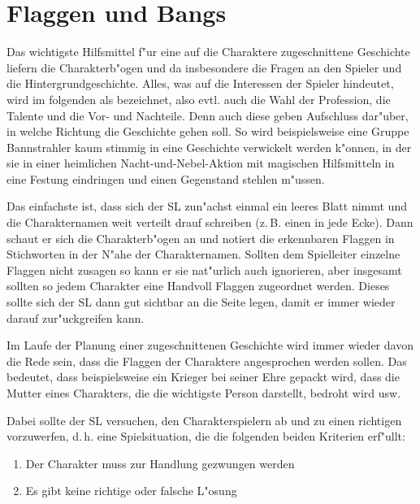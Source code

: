 \section{Flaggen und Bangs}
Das wichtigste Hilfsmittel f"ur eine auf die Charaktere zugeschnittene Geschichte liefern die Charakterb"ogen und da insbesondere die Fragen an den Spieler und die Hintergrundgeschichte. Alles, was auf die Interessen der Spieler hindeutet, wird im folgenden als  bezeichnet, also evtl. auch die Wahl der Profession, die Talente und die Vor- und Nachteile. Denn auch diese geben Aufschluss dar"uber, in welche Richtung die Geschichte gehen soll. So wird beispielsweise eine Gruppe Bannstrahler kaum stimmig in eine Geschichte verwickelt werden k"onnen, in der sie in einer heimlichen Nacht-und-Nebel-Aktion mit magischen Hilfsmitteln in eine Festung eindringen und einen Gegenstand stehlen m"ussen.

Das einfachste ist, dass sich der SL zun"achst einmal ein leeres Blatt nimmt und die Charakternamen weit verteilt drauf schreiben (z.\,B. einen in jede Ecke). Dann schaut er sich die Charakterb"ogen an und notiert die erkennbaren Flaggen in Stichworten in der N"ahe der Charakternamen. Sollten dem Spielleiter einzelne Flaggen nicht zusagen so kann er sie nat"urlich auch ignorieren, aber insgesamt sollten so jedem Charakter eine Handvoll Flaggen zugeordnet werden. Dieses  sollte sich der SL dann gut sichtbar an die Seite legen, damit er immer wieder darauf zur"uckgreifen kann.

Im Laufe der Planung einer zugeschnittenen Geschichte wird immer wieder davon die Rede sein, dass die Flaggen der Charaktere angesprochen werden sollen. Das bedeutet, dass beispielsweise ein Krieger bei seiner Ehre gepackt wird, dass die Mutter eines Charakters, die die wichtigste Person darstellt, bedroht wird usw.

Dabei sollte der SL versuchen, den Charakterspielern ab und zu einen richtigen  vorzuwerfen, d.\,h. eine Spielsituation, die die folgenden beiden Kriterien erf"ullt:
\begin{enumerate}
  \item Der Charakter muss zur Handlung gezwungen werden
  \item Es gibt keine richtige oder falsche L"osung
\end{enumerate}

